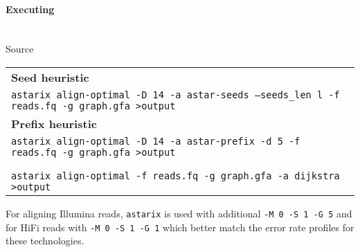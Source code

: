 

\paragraph{Executing \astarix}\mbox{}\\
\noindent Source \astarixurl \\
\begin{tabular}{p{10cm}}
	\textbf{Seed heuristic} \\
	\texttt{astarix align-optimal -D 14 -a astar-seeds --seeds\_len l -f reads.fq -g graph.gfa >output} \\
	\textbf{Prefix heuristic} \\
	\texttt{astarix align-optimal -D 14 -a astar-prefix -d 5 -f reads.fq -g graph.gfa >output} \\
	\textbf{\dijkstra} \\
	\astarixurlwithbranch \\
	\texttt{astarix align-optimal -f reads.fq -g graph.gfa -a dijkstra >output}
\end{tabular}

For aligning Illumina reads, \texttt{astarix} is used with additional \texttt{-M
0 -S 1 -G 5} and for HiFi reads with \texttt{-M 0 -S 1 -G 1} which better match
the error rate profiles for these technologies.

